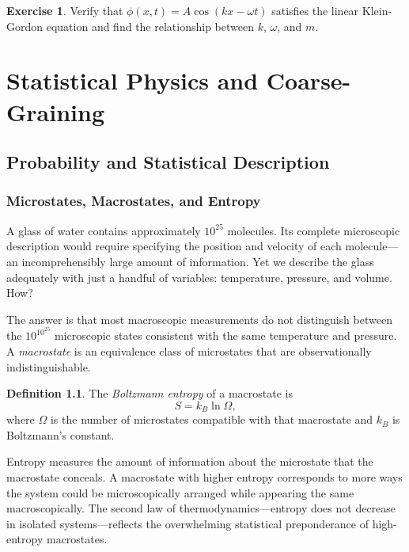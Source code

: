 \documentclass[12pt,a4paper,oneside]{book}
\theoremstyle{definition}
\newtheorem{definition}{Definition}[chapter]
\newtheorem{exercise}{Exercise}[chapter]
\theoremstyle{plain}
\theoremstyle{remark}
\begin{document}
\begin{exercise}
Verify that $\phi(x,t) = A\cos(kx - \omega t)$ satisfies the linear Klein-Gordon
equation and find the relationship between $k$, $\omega$, and $m$.
\end{exercise}

\part{Statistical Physics and Coarse-Graining}

\chapter{Probability and Statistical Description}

\section{Microstates, Macrostates, and Entropy}

A glass of water contains approximately $10^{25}$ molecules. Its complete
microscopic description would require specifying the position and velocity of
each molecule---an incomprehensibly large amount of information. Yet we
describe the glass adequately with just a handful of variables: temperature,
pressure, and volume. How?

The answer is that most macroscopic measurements do not distinguish between the
$10^{10^{25}}$ microscopic states consistent with the same temperature and
pressure. A \emph{macrostate} is an equivalence class of microstates that
are observationally indistinguishable.

\begin{definition}
The \emph{Boltzmann entropy} of a macrostate is
\begin{equation}
S = k_B \ln \Omega,
\end{equation}
where $\Omega$ is the number of microstates compatible with that macrostate
and $k_B$ is Boltzmann's constant.
\end{definition}

Entropy measures the amount of information about the microstate that the
macrostate conceals. A macrostate with higher entropy corresponds to more
ways the system could be microscopically arranged while appearing the same
macroscopically. The second law of thermodynamics---entropy does not
decrease in isolated systems---reflects the overwhelming statistical
preponderance of high-entropy macrostates.
\end{document}
